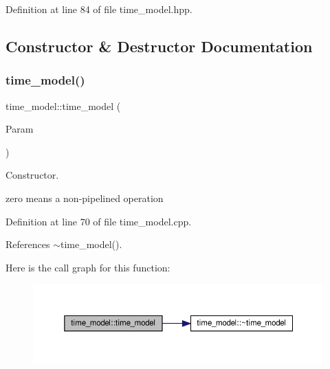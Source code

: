 Definition at line 84 of file time\+\_\+model.\+hpp.



\subsection{Constructor \& Destructor Documentation}
\mbox{\label{classtime__model_a1a53663bd0061bd8cc2cc476119f2e31}} 
\subsubsection{\texorpdfstring{time\+\_\+model()}{time\_model()}}
{\footnotesize\ttfamily time\+\_\+model\+::time\+\_\+model (\begin{DoxyParamCaption}\item[{const \hyperlink{Parameter_8hpp_a37841774a6fcb479b597fdf8955eb4ea}{Parameter\+Const\+Ref}}]{Param }\end{DoxyParamCaption})\hspace{0.3cm}{\ttfamily [explicit]}}



Constructor. 

zero means a non-\/pipelined operation 

Definition at line 70 of file time\+\_\+model.\+cpp.



References $\sim$time\+\_\+model().

Here is the call graph for this function\+:
\nopagebreak
\begin{figure}[H]
\begin{center}
\leavevmode
\includegraphics[width=350pt]{d3/d73/classtime__model_a1a53663bd0061bd8cc2cc476119f2e31_cgraph}
\end{center}
\end{figure}
\mbox{\label{classtime__model_a4067a65b6c76225fb9c949d471532653}} 
